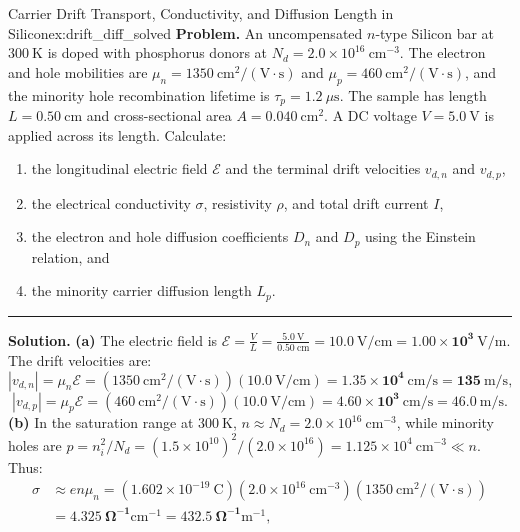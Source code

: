 \documentclass[11pt,a4paper]{article}
\newcommand{\abs}[1]{\left|#1\right|}
\begin{document}
\begin{examplebox}{Carrier Drift Transport, Conductivity, and Diffusion Length in Silicon}{ex:drift_diff_solved}
\textbf{Problem.} An uncompensated $n$-type Silicon bar at $300\ \mathrm{K}$ is doped with phosphorus donors at $N_d = 2.0\times 10^{16}\ \mathrm{cm^{-3}}$. The electron and hole mobilities are $\mu_n = 1350\ \mathrm{cm^2/(V\cdot s)}$ and $\mu_p = 460\ \mathrm{cm^2/(V\cdot s)}$, and the minority hole recombination lifetime is $\tau_p = 1.2\ \mu\mathrm{s}$. The sample has length $L = 0.50\ \mathrm{cm}$ and cross-sectional area $A = 0.040\ \mathrm{cm^2}$. A DC voltage $V = 5.0\ \mathrm{V}$ is applied across its length.
Calculate:
\begin{enumerate}[noitemsep]
    \item the longitudinal electric field $\mathcal{E}$ and the terminal drift velocities $v_{d,n}$ and $v_{d,p}$,
    \item the electrical conductivity $\sigma$, resistivity $\rho$, and total drift current $I$,
    \item the electron and hole diffusion coefficients $D_n$ and $D_p$ using the Einstein relation, and
    \item the minority carrier diffusion length $L_p$.
\end{enumerate}
\vspace{0.2cm}\hrule\vspace{0.2cm}
\textbf{Solution.}
\textbf{(a)} The electric field is $\mathcal{E} = \frac{V}{L} = \frac{5.0\ \mathrm{V}}{0.50\ \mathrm{cm}} = \mathbf{10.0\ \mathrm{V/cm} = 1.00\times 10^3\ \mathrm{V/m}}$.
The drift velocities are:
\[
    \abs{v_{d,n}} = \mu_n \mathcal{E} = (1350\ \mathrm{cm^2/(V\cdot s)})(10.0\ \mathrm{V/cm}) = \mathbf{1.35\times 10^4\ \mathrm{cm/s} = 135\ \mathrm{m/s}},
\]
\[
    \abs{v_{d,p}} = \mu_p \mathcal{E} = (460\ \mathrm{cm^2/(V\cdot s)})(10.0\ \mathrm{V/cm}) = \mathbf{4.60\times 10^3\ \mathrm{cm/s} = 46.0\ \mathrm{m/s}}.
\]
\textbf{(b)} In the saturation range at $300\ \mathrm{K}$, $n \approx N_d = 2.0\times 10^{16}\ \mathrm{cm^{-3}}$, while minority holes are $p = n_i^2/N_d = (1.5\times 10^{10})^2 / (2.0\times 10^{16}) = 1.125\times 10^4\ \mathrm{cm^{-3}} \ll n$. Thus:
\begin{align*}
    \sigma &\approx e n \mu_n = (1.602\times 10^{-19}\ \mathrm{C})(2.0\times 10^{16}\ \mathrm{cm^{-3}})(1350\ \mathrm{cm^2/(V\cdot s)}) \\
           &= \mathbf{4.325\ \Omega^{-1}\mathrm{cm^{-1}} = 432.5\ \Omega^{-1}\mathrm{m^{-1}}},
\end{align*}

\end{examplebox}
\end{document}
